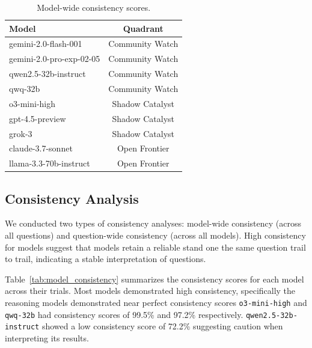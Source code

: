 \begin{table}[htbp]
    \centering
    \caption{Model-wide consistency scores.}
    \label{tab:model_quadrant}
    \begin{tabular}{l c}
        \hline
        Model & Quadrant \\
        \hline
        gemini-2.0-flash-001 & Community Watch \\
        gemini-2.0-pro-exp-02-05 & Community Watch \\
        qwen2.5-32b-instruct & Community Watch \\
        qwq-32b & Community Watch \\
        o3-mini-high & Shadow Catalyst \\
        gpt-4.5-preview & Shadow Catalyst \\
        grok-3 & Shadow Catalyst \\
        claude-3.7-sonnet & Open Frontier \\
        llama-3.3-70b-instruct & Open Frontier \\
        \hline
    \end{tabular}
\end{table}

\subsection{Consistency Analysis}

We conducted two types of consistency analyses: model-wide consistency (across all questions) and question-wide consistency (across all models). High consistency for models suggest that models retain a reliable stand one the same question trail to trail, indicating a stable interpretation of questions. 

Table~\ref{tab:model_consistency} summarizes the consistency scores for each model across their trials. Most models demonstrated high consistency, specifically the reasoning models demonstrated near perfect consistency scores \texttt{o3-mini-high} and \texttt{qwq-32b} had consistency scores of 99.5\% and 97.2\% respectively. \texttt{qwen2.5-32b-instruct} showed a low consistency score of 72.2\% suggesting caution when interpreting its results.

